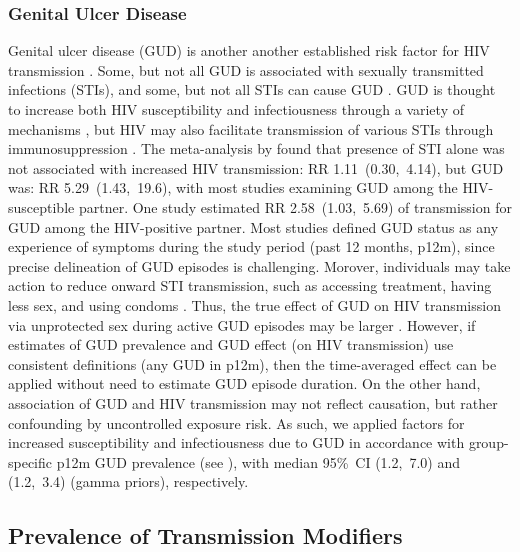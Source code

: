 \subsubsection{Genital Ulcer Disease}\label{mod.par.beta.gud}
Genital ulcer disease (GUD)
is another another established risk factor for HIV transmission \cite{Plummer1991,Fleming1999}.
Some, but not all GUD is associated with sexually transmitted infections (STIs),
and some, but not all STIs can cause GUD \cite{Fleming1999}.
GUD is thought to increase both HIV susceptibility and infectiousness
through a variety of mechanisms \cite{Fleming1999,Sheffield2007,Fox2010tx},
but HIV may also facilitate transmission of various STIs
through immunosuppression \cite{Wasserheit1992}.
The meta-analysis by \citet{Boily2009} found that
presence of STI alone was not associated with increased HIV transmission: RR 1.11~(0.30,~4.14),
but GUD was: RR 5.29~(1.43,~19.6),
with most studies examining GUD among the HIV-susceptible partner.
One study \cite{Gray2001} estimated RR 2.58~(1.03,~5.69) of transmission
for GUD among the HIV-positive partner.
Most studies defined GUD status as any experience of symptoms during the study period
(\eg past 12 months, p12m),
since precise delineation of GUD episodes is challenging.
Morover, individuals may take action to reduce onward STI transmission,
such as accessing treatment, having less sex, and using condoms \cite{SDHS2006}.
Thus, the true effect of GUD on HIV transmission
via unprotected sex during active GUD episodes may be larger \cite{Sousa2022}.
However, if estimates of GUD prevalence and GUD effect (on HIV transmission)
use consistent definitions (\eg any GUD in p12m),
then the time-averaged effect can be applied without need to estimate GUD episode duration.
On the other hand, association of GUD and HIV transmission may not reflect causation,
but rather confounding by uncontrolled exposure risk.
As such, we applied factors for increased susceptibility and infectiousness due to GUD
in accordance with group-specific p12m GUD prevalence (see ),
with median 95\%~CI (1.2,~7.0) and (1.2,~3.4) (gamma priors), respectively.
\subsection{Prevalence of Transmission Modifiers}\label{mod.par.tm}
